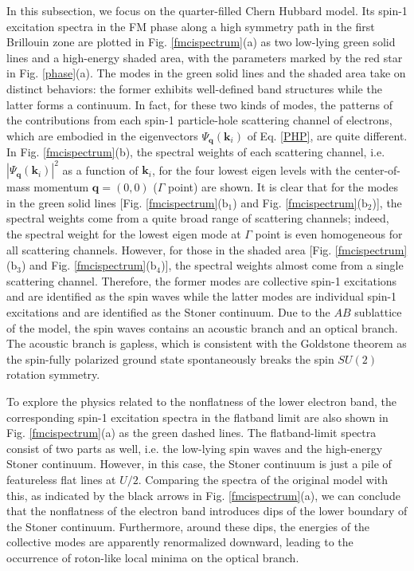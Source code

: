 \documentclass[amsmath,superscriptaddress,showpacs,aps,prb,twocolumn]{revtex4-1}
\begin{document}
\par In this subsection, we focus on the quarter-filled Chern Hubbard model. Its spin-1 excitation spectra in the FM phase along a high symmetry path in the first Brillouin zone are plotted in Fig. \ref{fmcispectrum}(a) as two low-lying green solid lines and a high-energy shaded area, with the parameters marked by the red star in Fig. \ref{phase}(a). The modes in the green solid lines and the shaded area take on distinct behaviors: the former exhibits well-defined band structures while the latter forms a continuum. In fact, for these two kinds of modes, the patterns of the contributions from each spin-1 particle-hole scattering channel of electrons, which are embodied in the eigenvectors $\Psi_{\mathbf{q}}(\mathbf{k}_i)$ of Eq. \ref{PHP}, are quite different. In Fig. \ref{fmcispectrum}(b), the spectral weights of each scattering channel, i.e. $|\Psi_{\mathbf{q}}(\mathbf{k}_i)|^2$ as a function of $\mathbf{k}_i$, for the four lowest eigen levels with the center-of-mass momentum $\mathbf{q}=(0,0)$ ($\Gamma$ point) are shown. It is clear that for the modes in the green solid lines [Fig. \ref{fmcispectrum}($\text{b}_1$) and Fig. \ref{fmcispectrum}($\text{b}_2$)], the spectral weights come from a quite broad range of scattering channels; indeed, the spectral weight for the lowest eigen mode at $\Gamma$ point is even homogeneous for all scattering channels. However, for those in the shaded area [Fig. \ref{fmcispectrum}($\text{b}_3$) and Fig. \ref{fmcispectrum}($\text{b}_4$)], the spectral weights almost come from a single scattering channel. Therefore, the former modes are collective spin-1 excitations and are identified as the spin waves while the latter modes are individual spin-1 excitations and are identified as the Stoner continuum. Due to the $AB$ sublattice of the model, the spin waves contains an acoustic branch and an optical branch. The acoustic branch is gapless, which is consistent with the Goldstone theorem as the spin-fully polarized ground state spontaneously breaks the spin $SU(2)$ rotation symmetry.

\par To explore the physics related to the nonflatness of the lower electron band, the corresponding spin-1 excitation spectra in the flatband limit are also shown in Fig. \ref{fmcispectrum}(a) as the green dashed lines. The flatband-limit spectra consist of two parts as well, i.e. the low-lying spin waves and the high-energy Stoner continuum. However, in this case, the Stoner continuum is just a pile of featureless flat lines at $U/2$. Comparing the spectra of the original model with this, as indicated by the black arrows in Fig. \ref{fmcispectrum}(a), we can conclude that the nonflatness of the electron band introduces dips of the lower boundary of the Stoner continuum. Furthermore, around these dips, the energies of the collective modes are apparently renormalized downward, leading to the occurrence of roton-like local minima on the optical branch.
\end{document}
